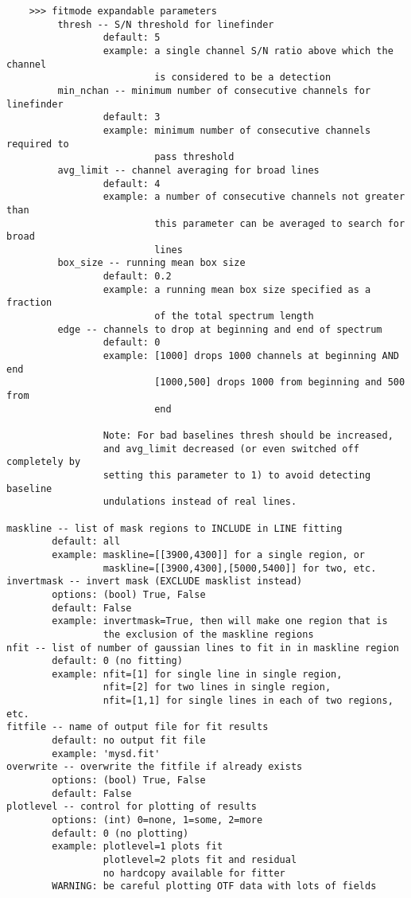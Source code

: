 \begin{verbatim}
    >>> fitmode expandable parameters             
         thresh -- S/N threshold for linefinder
                 default: 5
                 example: a single channel S/N ratio above which the channel  
                          is considered to be a detection
         min_nchan -- minimum number of consecutive channels for linefinder
                 default: 3
                 example: minimum number of consecutive channels required to  
                          pass threshold
         avg_limit -- channel averaging for broad lines
                 default: 4
                 example: a number of consecutive channels not greater than
                          this parameter can be averaged to search for broad 
                          lines
         box_size -- running mean box size
                 default: 0.2
                 example: a running mean box size specified as a fraction
                          of the total spectrum length
         edge -- channels to drop at beginning and end of spectrum
                 default: 0
                 example: [1000] drops 1000 channels at beginning AND end
                          [1000,500] drops 1000 from beginning and 500 from 
                          end
        
                 Note: For bad baselines thresh should be increased,
                 and avg_limit decreased (or even switched off completely by
                 setting this parameter to 1) to avoid detecting baseline
                 undulations instead of real lines.
        
maskline -- list of mask regions to INCLUDE in LINE fitting
        default: all
        example: maskline=[[3900,4300]] for a single region, or
                 maskline=[[3900,4300],[5000,5400]] for two, etc.
invertmask -- invert mask (EXCLUDE masklist instead)
        options: (bool) True, False
        default: False
        example: invertmask=True, then will make one region that is
                 the exclusion of the maskline regions
nfit -- list of number of gaussian lines to fit in in maskline region
        default: 0 (no fitting)
        example: nfit=[1] for single line in single region,
                 nfit=[2] for two lines in single region,
                 nfit=[1,1] for single lines in each of two regions, etc.
fitfile -- name of output file for fit results
        default: no output fit file
        example: 'mysd.fit'
overwrite -- overwrite the fitfile if already exists
        options: (bool) True, False
        default: False
plotlevel -- control for plotting of results
        options: (int) 0=none, 1=some, 2=more
        default: 0 (no plotting)
        example: plotlevel=1 plots fit
                 plotlevel=2 plots fit and residual 
                 no hardcopy available for fitter
        WARNING: be careful plotting OTF data with lots of fields
        

\end{verbatim}
